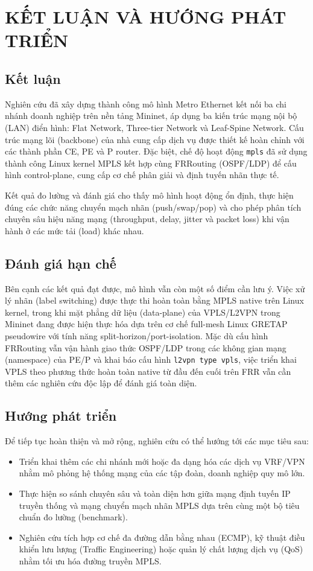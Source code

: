 \section{KẾT LUẬN VÀ HƯỚNG PHÁT TRIỂN}

\subsection{Kết luận}

Nghiên cứu đã xây dựng thành công mô hình Metro Ethernet kết nối ba chi nhánh doanh nghiệp trên nền tảng Mininet, áp dụng ba kiến trúc mạng nội bộ (LAN) điển hình: Flat Network, Three-tier Network và Leaf-Spine Network. Cấu trúc mạng lõi (backbone) của nhà cung cấp dịch vụ được thiết kế hoàn chỉnh với các thành phần CE, PE và P router. Đặc biệt, chế độ hoạt động \texttt{mpls} đã sử dụng thành công Linux kernel MPLS kết hợp cùng FRRouting (OSPF/LDP) để cấu hình control-plane, cung cấp cơ chế phân giải và định tuyến nhãn thực tế.

Kết quả đo lường và đánh giá cho thấy mô hình hoạt động ổn định, thực hiện đúng các chức năng chuyển mạch nhãn (push/swap/pop) và cho phép phân tích chuyên sâu hiệu năng mạng (throughput, delay, jitter và packet loss) khi vận hành ở các mức tải (load) khác nhau.

\subsection{Đánh giá hạn chế}

Bên cạnh các kết quả đạt được, mô hình vẫn còn một số điểm cần lưu ý. Việc xử lý nhãn (label switching) được thực thi hoàn toàn bằng MPLS native trên Linux kernel, trong khi mặt phẳng dữ liệu (data-plane) của VPLS/L2VPN trong Mininet đang được hiện thực hóa dựa trên cơ chế full-mesh Linux GRETAP pseudowire với tính năng split-horizon/port-isolation. Mặc dù cấu hình FRRouting vẫn vận hành giao thức OSPF/LDP trong các không gian mạng (namespace) của PE/P và khai báo cấu hình \texttt{l2vpn type vpls}, việc triển khai VPLS theo phương thức hoàn toàn native từ đầu đến cuối trên FRR vẫn cần thêm các nghiên cứu độc lập để đánh giá toàn diện.

\subsection{Hướng phát triển}

Để tiếp tục hoàn thiện và mở rộng, nghiên cứu có thể hướng tới các mục tiêu sau:
\begin{itemize}
    \item Triển khai thêm các chi nhánh mới hoặc đa dạng hóa các dịch vụ VRF/VPN nhằm mô phỏng hệ thống mạng của các tập đoàn, doanh nghiệp quy mô lớn.
    \item Thực hiện so sánh chuyên sâu và toàn diện hơn giữa mạng định tuyến IP truyền thống và mạng chuyển mạch nhãn MPLS dựa trên cùng một bộ tiêu chuẩn đo lường (benchmark).
    \item Nghiên cứu tích hợp cơ chế đa đường dẫn bằng nhau (ECMP), kỹ thuật điều khiển lưu lượng (Traffic Engineering) hoặc quản lý chất lượng dịch vụ (QoS) nhằm tối ưu hóa đường truyền MPLS.
\end{itemize}
